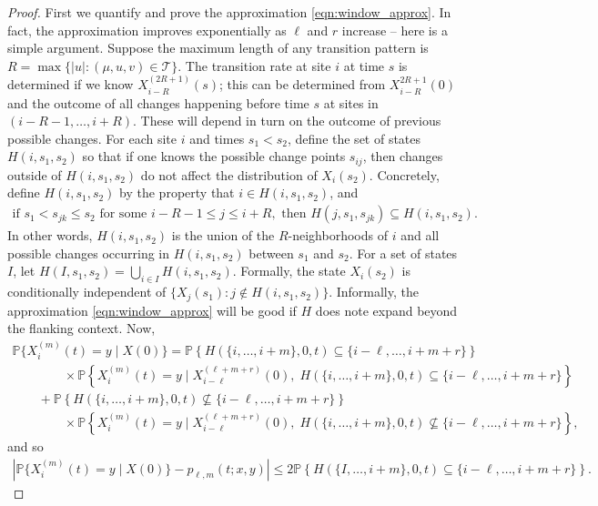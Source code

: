 \documentclass{article}
\renewcommand{\P}{\mathbb{P}}
\newcommand{\calT}{\mathcal{T}}  %
\newcommand{\st}{\colon}  %
\theoremstyle{plain}
\theoremstyle{definition}
\begin{document}
\begin{proof}

First we quantify and prove the approximation \eqref{eqn:window_approx}.
In fact, the approximation improves exponentially as $\ell$ and $r$ increase --
here is a simple argument.
Suppose the maximum length of any transition pattern is $R = \max\{ |u| : (\mu,u,v) \in \calT \}$.
The transition rate at site $i$ at time $s$ is determined if we know $X_{i-R}^{(2R+1)}(s)$;
this can be determined from $X_{i-R}^{2R+1}(0)$ and the outcome of all changes happening before time $s$ at sites in $(i-R-1, \ldots, i+R)$.
These will depend in turn on the outcome of previous possible changes.
For each site $i$ and times $s_1 < s_2$, define the set of states $H(i,s_1,s_2)$
so that if one knows the possible change points $s_{ij}$,
then changes outside of $H(i,s_1,s_2)$ do not affect the distribution of $X_i(s_2)$.
Concretely, define $H(i,s_1,s_2)$ by the property that $i \in H(i,s_1,s_2)$, and
\begin{gather}
  \text{if } s_1 < s_{jk} \le s_2 \text{ for some } i-R-1 \le j \le i+R, \text{ then } H(j,s_1,s_{jk}) \subseteq H(i,s_1,s_2) .
\end{gather}
In other words, $H(i,s_1,s_2)$ is the union of the $R$-neighborhoods of $i$ and all possible changes occurring in $H(i,s_1,s_2)$ between $s_1$ and $s_2$.
For a set of states $I$, let $H(I,s_1,s_2) = \bigcup_{i\in I} H(i,s_1,s_2)$.
Formally, the state $X_i(s_2)$ is conditionally independent of $\{X_j(s_1) \st j \notin H(i,s_1,s_2)\}$.
Informally, the approximation \eqref{eqn:window_approx} will be good if $H$ does note expand beyond the flanking context.
Now,
\begin{multline}
  \P\{ X_i^{(m)}(t) = y \mid X(0) \}
  = \P\left\{ H(\{i,\ldots,i+m\},0,t)\subseteq\{i-\ell,\ldots,i+m+r\} \right\} \\
   \qquad \qquad {} \times \P\left\{ X_i^{(m)}(t) = y \mid X_{i-\ell}^{(\ell+m+r)}(0), \; H(\{i,\ldots,i+m\},0,t)\subseteq\{i-\ell,\ldots,i+m+r\} \right\} \\
     \qquad {} + \P\left\{ H(\{i,\ldots,i+m\},0,t)\nsubseteq\{i-\ell,\ldots,i+m+r\} \right\}  \\
   \qquad\qquad {} \times \P\left\{ X_i^{(m)}(t) = y \mid X_{i-\ell}^{(\ell+m+r)}(0), \; H(\{i,\ldots,i+m\},0,t)\nsubseteq\{i-\ell,\ldots,i+m+r\} \right\} ,
\end{multline}
and so
\begin{align} \label{eqn:prob_approx}
  \left| \P\{ X_i^{(m)}(t) = y \mid X(0) \} - p_{\ell,m}(t;x,y) \right| \le 2 \P\left\{  H(\{I,\ldots,i+m\},0,t)\subseteq\{i-\ell,\ldots,i+m+r\} \right\}.
\end{align}


\end{proof}
\end{document}
